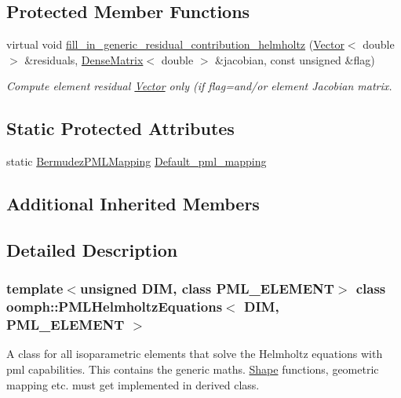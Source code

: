 \subsection*{Protected Member Functions}
\begin{DoxyCompactItemize}
\item 
virtual void \hyperlink{classoomph_1_1PMLHelmholtzEquations_ac066463c7af3e2f30146e47553508bce}{fill\+\_\+in\+\_\+generic\+\_\+residual\+\_\+contribution\+\_\+helmholtz} (\hyperlink{classoomph_1_1Vector}{Vector}$<$ double $>$ \&residuals, \hyperlink{classoomph_1_1DenseMatrix}{Dense\+Matrix}$<$ double $>$ \&jacobian, const unsigned \&flag)
\begin{DoxyCompactList}\small\item\em Compute element residual \hyperlink{classoomph_1_1Vector}{Vector} only (if flag=and/or element Jacobian matrix. \end{DoxyCompactList}\end{DoxyCompactItemize}
\subsection*{Static Protected Attributes}
\begin{DoxyCompactItemize}
\item 
static \hyperlink{classoomph_1_1BermudezPMLMapping}{Bermudez\+P\+M\+L\+Mapping} \hyperlink{classoomph_1_1PMLHelmholtzEquations_a9b81f7f0eadc87a9b29d1ea9a8e25953}{Default\+\_\+pml\+\_\+mapping}
\end{DoxyCompactItemize}
\subsection*{Additional Inherited Members}


\subsection{Detailed Description}
\subsubsection*{template$<$unsigned D\+IM, class P\+M\+L\+\_\+\+E\+L\+E\+M\+E\+NT$>$\newline
class oomph\+::\+P\+M\+L\+Helmholtz\+Equations$<$ D\+I\+M, P\+M\+L\+\_\+\+E\+L\+E\+M\+E\+N\+T $>$}

A class for all isoparametric elements that solve the Helmholtz equations with pml capabilities. This contains the generic maths. \hyperlink{classoomph_1_1Shape}{Shape} functions, geometric mapping etc. must get implemented in derived class. 

